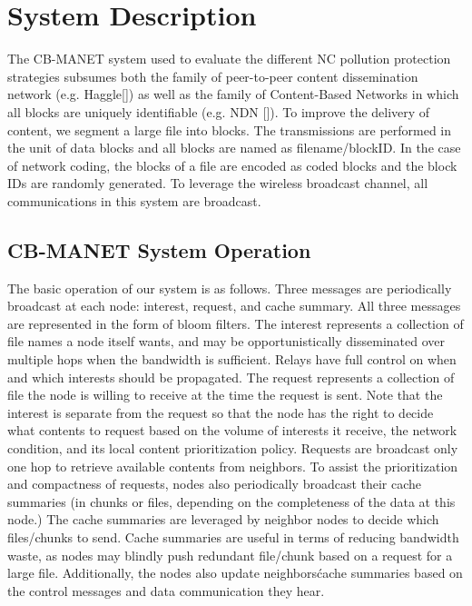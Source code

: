 \section{System Description}

The CB-MANET system used to evaluate the different NC pollution protection strategies 
subsumes both the family of peer-to-peer content dissemination network (e.g. Haggle[]) as well as the family of Content-Based Networks in which all blocks are uniquely identifiable (e.g. NDN []). To improve the delivery of content, we segment a large file into blocks. The transmissions are performed in the unit of data blocks and all blocks are named as filename/blockID. In the case of network coding, the blocks of a file are encoded as coded blocks and the block IDs are randomly generated. To leverage the wireless broadcast channel, all communications in this system are broadcast. 

\subsection{CB-MANET System Operation}

The basic operation of our system is as follows. Three messages are periodically broadcast at each node: interest, request, and cache summary. All three messages are represented in the form of bloom filters. The interest represents a collection of file names a node itself wants, and may be opportunistically disseminated over multiple hops when the bandwidth is sufficient. Relays have full control on when and which interests should be propagated. The request represents a collection of file the node is willing to receive at the time the request is sent. Note that the interest is separate from the request so that the node has the right to decide what contents to request based on the volume of interests it receive, the network condition, and its local content prioritization policy. Requests are broadcast only one hop to retrieve available contents from neighbors. To assist the prioritization and compactness of requests, nodes also periodically broadcast their cache summaries (in chunks or files, depending on the completeness of the data at this node.) The cache summaries are leveraged by neighbor nodes to decide which files/chunks to send. Cache summaries are useful in terms of reducing bandwidth waste, as nodes may blindly push redundant file/chunk based on a request for a large file.  Additionally, the nodes also update neighbors\' cache summaries based on the control messages and data communication they hear.

